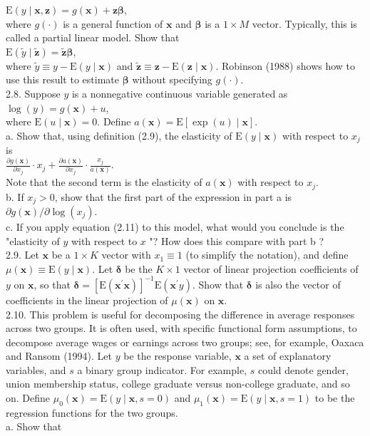 \documentclass[10pt]{article}
\begin{document}
$\mathrm{E}(y \mid \mathbf{x}, \mathbf{z})=g(\mathbf{x})+\mathbf{z} \boldsymbol{\beta}$,\\
where $g(\cdot)$ is a general function of $\mathbf{x}$ and $\boldsymbol{\beta}$ is a $1 \times M$ vector. Typically, this is called a partial linear model. Show that\\
$\mathrm{E}(\tilde{y} \mid \tilde{\mathbf{z}})=\tilde{\mathbf{z}} \boldsymbol{\beta}$,\\
where $\tilde{y} \equiv y-\mathrm{E}(y \mid \mathbf{x})$ and $\tilde{\mathbf{z}} \equiv \mathbf{z}-\mathrm{E}(\mathbf{z} \mid \mathbf{x})$. Robinson (1988) shows how to use this result to estimate $\boldsymbol{\beta}$ without specifying $g(\cdot)$.\\
2.8. Suppose $y$ is a nonnegative continuous variable generated as\\
$\log (y)=g(\mathbf{x})+u$,\\
where $\mathrm{E}(u \mid \mathbf{x})=0$. Define $a(\mathbf{x})=\mathrm{E}[\exp (u) \mid \mathbf{x}]$.\\
a. Show that, using definition (2.9), the elasticity of $\mathrm{E}(y \mid \mathbf{x})$ with respect to $x_{j}$ is\\
$\frac{\partial g(\mathbf{x})}{\partial x_{j}} \cdot x_{j}+\frac{\partial a(\mathbf{x})}{\partial x_{j}} \cdot \frac{x_{j}}{a(\mathbf{x})}$.\\
Note that the second term is the elasticity of $a(\mathbf{x})$ with respect to $x_{j}$.\\
b. If $x_{j}>0$, show that the first part of the expression in part a is $\partial g(\mathbf{x}) / \partial \log \left(x_{j}\right)$.\\
c. If you apply equation (2.11) to this model, what would you conclude is the "elasticity of $y$ with respect to $x$ "? How does this compare with part b ?\\
2.9. Let $\mathbf{x}$ be a $1 \times K$ vector with $x_{1} \equiv 1$ (to simplify the notation), and define $\mu(\mathbf{x}) \equiv \mathrm{E}(y \mid \mathbf{x})$. Let $\boldsymbol{\delta}$ be the $K \times 1$ vector of linear projection coefficients of $y$ on $\mathbf{x}$, so that $\boldsymbol{\delta}=\left[\mathrm{E}\left(\mathbf{x}^{\prime} \mathbf{x}\right)\right]^{-1} \mathrm{E}\left(\mathbf{x}^{\prime} y\right)$. Show that $\boldsymbol{\delta}$ is also the vector of coefficients in the linear projection of $\mu(\mathbf{x})$ on $\mathbf{x}$.\\
2.10. This problem is useful for decomposing the difference in average responses across two groups. It is often used, with specific functional form assumptions, to decompose average wages or earnings across two groups; see, for example, Oaxaca and Ransom (1994). Let $y$ be the response variable, $\mathbf{x}$ a set of explanatory variables, and $s$ a binary group indicator. For example, $s$ could denote gender, union membership status, college graduate versus non-college graduate, and so on. Define $\mu_{0}(\mathbf{x})= \mathrm{E}(y \mid \mathbf{x}, s=0)$ and $\mu_{1}(\mathbf{x})=\mathrm{E}(y \mid \mathbf{x}, s=1)$ to be the regression functions for the two groups.\\
a. Show that
\end{document}
